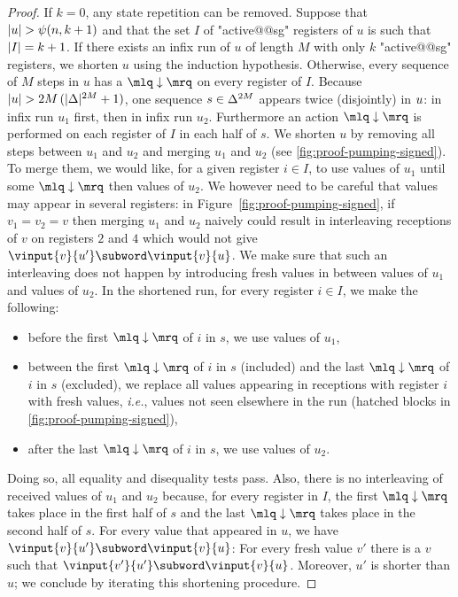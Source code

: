 \begin{proof}
If $k=0$, any state repetition can be removed. Suppose that $|u| > \psi(n,k+1)$ and that the set $I$ of "active@@sg" registers of $u$ is such that $|I| = k+1$. If there exists an infix run of $u$ of length $M$ with only $k$ "active@@sg" registers, we shorten $u$ using the induction hypothesis. Otherwise, every sequence of $M$ steps in $u$ has a $\quotemarks{\enregact}$ on every register of $I$. Because $|u| > 2 M \, (|\Delta|^{2M} +1)$, one sequence $s \in \Delta^{2M}$ appears twice (disjointly) in $u$: in infix run $u_1$ first, then in infix run $u_2$. Furthermore an action $\quotemarks{\enregact}$ is performed on each register of $I$ in each half of $s$. We shorten $u$ by removing all steps between $u_1$ and $u_2$ and merging $u_1$ and $u_2$ (see \cref{fig:proof-pumping-signed}). To merge them, we would like, for a given register $i \in I$, to use values of $u_1$ until some $\quotemarks{\enregact}$ then values of $u_2$. We however need to be careful that values may appear in several registers: in Figure~\ref{fig:proof-pumping-signed}, if $v_1 = v_2 = v$ then merging $u_1$ and $u_2$ naively could result in interleaving receptions of $v$ on registers $2$ and $4$ which would not give $\vinput{v}{u'} \subword \vinput{v}{u}$. We make sure that such an interleaving does not happen by introducing fresh values in between values of $u_1$ and values of $u_2$. In the shortened run, for every register $i \in I$, we make the following:
\begin{itemize}
\item before the first $\quotemarks{\enregact}$ of $i$ in $s$, we use values of $u_1$,
\item between the first $\quotemarks{\enregact}$ of $i$ in $s$ (included) and the last $\quotemarks{\enregact}$ of $i$ in $s$ (excluded), we replace all values appearing in receptions with register $i$ with fresh values, \emph{i.e.}, values not seen elsewhere in the run (hatched blocks in \cref{fig:proof-pumping-signed}),
\item after the last $\quotemarks{\enregact}$ of $i$ in $s$, we use values of $u_2$.
\end{itemize}
Doing so, all equality and disequality tests pass. Also, there is no interleaving of received values of $u_1$ and $u_2$ because, for every register in $I$, the first $\quotemarks{\enregact}$ takes place in the first half of $s$ and the last $\quotemarks{\enregact}$ takes place in the second half of $s$. For every value that appeared in $u$, we have $\vinput{v}{u'} \subword \vinput{v}{u}$:  For every fresh value $v'$ there is a $v$ such that $\vinput{v'}{u'} \subword \vinput{v}{u}$. Moreover, $u'$ is shorter than $u$; we conclude by iterating this shortening procedure. 
\end{proof}
